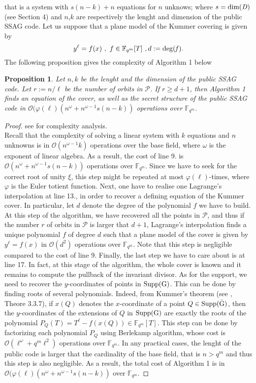 \documentclass[10pt]{article}
\newtheorem{prop1}{Proposition}[]
\newcommand{\s}{\vspace{0.3cm}}
\newcommand{\calO}{\mathcal{O}}
\newcommand{\fqm}{\mathbb{F}_{q^m}}
\newcommand{\w}{\omega}
\newcommand{\PR}{\mathcal{P}}
\begin{document}
that is a system with $s(n-k)+n$ equations for $n$ unknows; where $s=\rm dim \it(D)$ (see Section 4) and $n$,$k$ are respectively the lenght and dimension of the public SSAG code. Let us suppose that a plane model of the Kummer covering is given by 
\[y^{\ell} = f(x) \ , \ f \in \fqm[T] \ , d:=\rm{deg}(\it f).\]
The following proposition gives the complexity of Algorithm 1 below

\s

\begin{prop1} Let $n,k$ be the lenght and the dimension of the public \rm{SSAG} \it code. Let $r := n/\ell$ be the number of orbits in $\PR$. If $r \geq d+1$, then Algorithm 1 finds an equation of the cover, as well as the secret structure of the public \rm SSAG \it code in $\calO(\varphi(\ell)(n^{\w}+n^{\w-1}s(n-k))$ operations over $\fqm$. 

\end{prop1}

\s

\begin{proof} see \cite{CF} for complexity analysis. \\
Recall that the complexity of solving a linear system with $k$ equations and $n$ unknowns is in $\calO(n^{\w-1}k)$ operations over the base field, where $\w$ is the exponent of linear algebra. As a result, the cost of line 9. is $\calO(n^{\w}+n^{\w-1}s(n-k))$ operations over $\fqm$. Since we have to seek for the correct root of unity $\xi$, this step might be repeated at most $\varphi(\ell)$-times, where $\varphi$ is the Euler totient function. Next, one have to realise one Lagrange's interpolation at line 13., in order to recover a defining equation of the Kummer cover. In particular, let $d$ denote the degree of the polynomial $f$ we have to build. At this step of the algorithm, we have recovered all the points in $\PR$, and thus if the number $r$ of orbits in $\PR$ is larger that $d+1$, Lagrange's interpolation finds a unique polynomial $f$ of degree $d$ such that a plane model of the cover is given by $y^{\ell}=f(x)$ in $\calO(d^2)$ operations over $\fqm$. Note that this step is negligible compared to the cost of line 9. Finally, the last step we have to care about is at line 17. In fact, at this stage of the algorithm, the whole cover is known and it remains to compute the pullback of the invariant divisor. As for the support, we need to recover the $y$-coordinates of points in $\rm{Supp}(G)$. This can be done by finding roots of several polynomials. Indeed, from Kummer's theorem (see \cite{Sti}, Theore 3.3.7), if $x(Q)$ denotes the $x$-coordinate of a point $Q \in \rm{Supp}(\tilde{G})$, then the $y$-coordinates of the extensions of $Q$ in $\rm{Supp}(G)$ are exactly the roots of the polynomial $P_Q(T)=T^{\ell}-f(x(Q)) \in \fqm[T]$. This step can be done by factorizing each polynomial $P_Q$ using Berlekamp algorithm, whose cost is $\calO(\ell^{\w}+q^m\ell^{2})$ operations over $\fqm$. In any practical cases, the lenght of the public code is larger that the cardinality of the base field, that is $n > q^m$ and thus this step is also negligible. As a result, the total cost of Algorithm 1 is in $\calO(\varphi(\ell)(n^{\w}+n^{\w-1}s(n-k))$ over $\fqm$.
\end{proof}
\end{document}
